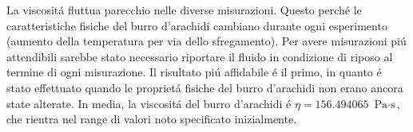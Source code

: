 La viscosit\'{a} fluttua parecchio nelle diverse misurazioni. Questo perch\'{e} le caratteristiche fisiche del burro d'arachidi 
cambiano durante ogni esperimento (aumento della temperatura per via dello sfregamento). Per avere misurazioni pi\'{u} attendibili 
sarebbe stato necessario riportare il fluido in condizione di riposo al termine di ogni misurazione. Il risultato pi\'{u} affidabile 
\'{e} il primo, in quanto \'{e} stato effettuato quando le propriet\'{a} fisiche del burro d'arachidi non erano ancora 
state alterate.
In media, la viscosit\'{a} del burro d'arachidi \'{e} $\eta = 156.494065$ $\text{Pa} \cdot \text{s}$, che rientra nel range di 
valori noto specificato inizialmente. 
